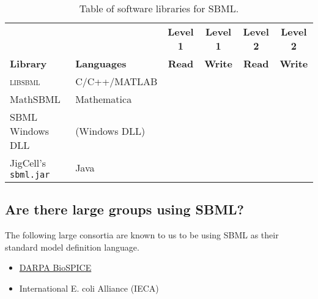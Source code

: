 \documentclass{sbmlfaq}
\newcommand{\yes}{\raisebox{1pt}{\rule{3.5pt}{3.5pt}}}
\newcommand{\yes}{\htmladdimg{sbml-faq-green-dot.gif}}
\begin{document}
\begin{table}[tbh]
  \centering
  \small
  \caption{Table of software libraries for SBML.}
  \label{tab:libs}
  \vspace*{2pt}
  \begin{tabular}{ll!{\hspace{10pt}}c!{\hspace{10pt}}c!{\hspace{10pt}}c!{\hspace{10pt}}c}
    \toprule
                     &                       & \textbf{Level 1} & \textbf{Level 1} & \textbf{Level 2} & \textbf{Level 2}\\
    \textbf{Library} & \textbf{Languages}    & \textbf{Read} & \textbf{Write} & \textbf{Read} & \textbf{Write}\\
    \midrule
    \textsc{libsbml}        & C/C++/MATLAB     & \yes      & \yes      & \yes  & \yes\\
    MathSBML            & Mathematica       & \yes      & \yes\\
    SBML Windows DLL        & (Windows DLL)     & \yes      & \yes\\
    JigCell's \texttt{sbml.jar} & Java          &           &       & \yes  & \yes\\
    \bottomrule
  \end{tabular}
\end{table}


%

\subsection{Are there large groups using SBML?}

The following large consortia are known to us to be using SBML as their
standard model definition language.
\begin{itemize}\setlength{\parskip}{-1ex}
\item \href{https://community.biospice.org/}{DARPA BioSPICE}
\item International E. coli Alliance (IECA)
\end{itemize}
\end{document}
